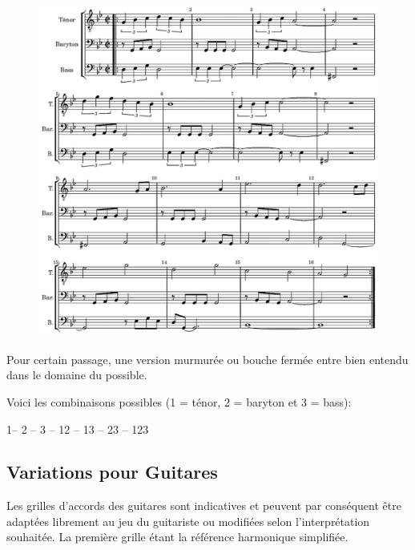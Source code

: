  \begin{figure}[H]
\begin{center}
\includegraphics[scale=0.68]{img/dlc1}
\end{center}
\end{figure}

Pour certain passage, une version murmur\'{e}e ou bouche ferm\'{e}e entre bien entendu dans le domaine du possible.


Voici les combinaisons possibles (1 =  t\'{e}nor, 2 = baryton et 3 =  bass): 

1-- 2 -- 3 -- 12 -- 13 -- 23 -- 123

\subsection*{Variations pour Guitares}
Les grilles d'accords des guitares sont indicatives et peuvent par cons\'{e}quent \^{e}tre adapt\'{e}es librement au jeu du guitariste ou modifi\'{e}es selon l'interpr\'{e}tation souhait\'{e}e. La premi\`{e}re grille \'{e}tant la r\'{e}f\'{e}rence harmonique simplifi\'{e}e.

